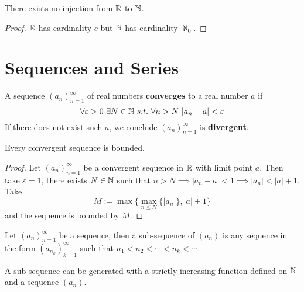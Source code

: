 \documentclass[11pt]{article}
\newcommand{\seq}[2]{({#1}_{#2})_{{#2}=1}^\infty}
\begin{document}
            \begin{theorem}
                There exists no injection from $\mathbb{R}$ to $\mathbb{N}$.
            \end{theorem}
            
            \begin{proof}
                $\mathbb{R}$ has cardinality $c$ but $\mathbb{N}$ has cardinality $\aleph_0$.
            \end{proof}
        
    \section{Sequences and Series}
        \begin{definition}
            A sequence $\seq{a}{n}$ of real numbers \textbf{converges} to a real number $a$ if
            \begin{equation}
                \forall \varepsilon > 0\ \exists N \in \mathbb{N}\ s.t.\ \forall n > N\ |a_n - a| < \varepsilon
            \end{equation}
            If there does not exist such $a$, we conclude $\seq{a}{n}$ is \textbf{divergent}.
        \end{definition}
        
        \begin{theorem}
            Every convergent sequence is bounded.
        \end{theorem}
        
        \begin{proof}
            Let $\seq{a}{n}$ be a convergent sequence in $\mathbb{R}$ with limit point $a$. Then take $\varepsilon=1$, there exists $N \in \mathbb{N}$ such that $n > N \implies |a_n - a| < 1 \implies |a_n| < |a| + 1$. Take 
            \begin{equation}
                M := \max\{\max_{n \leq N}\{|a_n|\}, |a| +1 \}
            \end{equation}
            and the sequence is bounded by $M$.
        \end{proof}
        
        \begin{definition}
            Let $\seq{a}{n}$ be a sequence, then a sub-sequence of $(a_n)$ is any sequence in the form $(a_{n_k})_{k=1}^\infty$ such that $n_1 < n_2 < \cdots < n_k < \cdots$.
        \end{definition}
        
        \begin{remark}
            A sub-sequence can be generated with a strictly increasing function defined on $\mathbb{N}$ and a sequence $(a_n)$.
        \end{remark}
        
\end{document}
